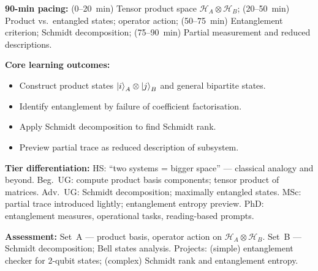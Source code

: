 \documentclass[11pt,a4paper]{article}
\begin{document}
\medskip
\begin{tcolorbox}[modulebox, title={Module~I.2 --- Lecture L09: Tensor Products: Composite Systems \& Entanglement}]
\textbf{90-min pacing:} (0--20~min) Tensor product space $\mathcal{H}_A\otimes\mathcal{H}_B$;
(20--50~min) Product vs.\ entangled states; operator action;
(50--75~min) Entanglement criterion; Schmidt decomposition;
(75--90~min) Partial measurement and reduced descriptions.

\medskip\textbf{Core learning outcomes:}
\begin{itemize}[leftmargin=1.4em,topsep=2pt,itemsep=1pt]
  \item Construct product states $\ket{i}_A\otimes\ket{j}_B$ and general bipartite states.
  \item Identify entanglement by failure of coefficient factorisation.
  \item Apply Schmidt decomposition to find Schmidt rank.
  \item Preview partial trace as reduced description of subsystem.
\end{itemize}

\medskip\textbf{Tier differentiation:}
HS: ``two systems = bigger space'' --- classical analogy and beyond.
Beg.\ UG: compute product basis components; tensor product of matrices.
Adv.\ UG: Schmidt decomposition; maximally entangled states.
MSc: partial trace introduced lightly; entanglement entropy preview.
PhD: entanglement measures, operational tasks, reading-based prompts.

\medskip\textbf{Assessment:}
Set~A --- product basis, operator action on $\mathcal{H}_A\otimes\mathcal{H}_B$.
Set~B --- Schmidt decomposition; Bell states analysis.
Projects: (simple) entanglement checker for 2-qubit states; (complex) Schmidt rank and entanglement entropy.
\end{tcolorbox}
\end{document}
